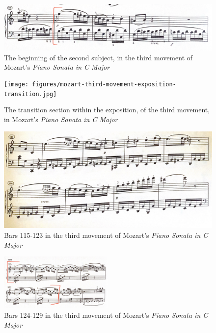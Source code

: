 \begin{figure}
	\centering
	\includegraphics[width=\textwidth]{figures/mozart-third-movement-beginning-of-second-subject-exposition.jpg}
	\caption[Subject number two, in the third movement of Mozart's \textit{Piano Sonata in C Major}]{The beginning of the second subject, in the third movement of Mozart's \textit{Piano Sonata in C Major}}
	\label{fig:mozart-third-movement-beginning-of-second-subject-exposition}
\end{figure}

\begin{figure}
  	\centering
  	\texttt{[image: figures/mozart-third-movement-exposition-transition.jpg]}
  	\caption{The transition section within the exposition, of the third movement, in Mozart's \textit{Piano Sonata in C Major}}
  	\label{fig:mozart-third-movement-exposition-transition}
\end{figure}

\begin{figure}
	\centering
	\includegraphics[width=\textwidth]{figures/mozart-third-movement-bars-116-123.jpg}
	\caption{Bars 115-123 in the third movement of Mozart's \textit{Piano Sonata in C Major}}
	\label{fig:mozart-third-movement-bars-116-123}
\end{figure}

\begin{figure}
	\centering
	\includegraphics[width=0.5\textwidth]{figures/mozart-third-movement-bars-124-129.jpg}
	\caption{Bars 124-129 in the third movement of Mozart's \textit{Piano Sonata in C Major}}
	\label{fig:mozart-third-movement-bars-124-129}
\end{figure}

